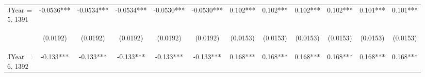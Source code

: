 \documentclass[]{article}
\begin{document}
\begin{center}
\begin{tabular}{lccccccccccc}
JYear = 5, 1391 & -0.0536*** & -0.0534*** & -0.0534*** & -0.0530*** & -0.0530*** & 0.102*** & 0.102*** & 0.102*** & 0.102*** & 0.101*** & 0.101*** \\
\vspace{4pt} & \begin{footnotesize}(0.0192)\end{footnotesize} & \begin{footnotesize}(0.0192)\end{footnotesize} & \begin{footnotesize}(0.0192)\end{footnotesize} & \begin{footnotesize}(0.0192)\end{footnotesize} & \begin{footnotesize}(0.0192)\end{footnotesize} & \begin{footnotesize}(0.0153)\end{footnotesize} & \begin{footnotesize}(0.0153)\end{footnotesize} & \begin{footnotesize}(0.0153)\end{footnotesize} & \begin{footnotesize}(0.0153)\end{footnotesize} & \begin{footnotesize}(0.0153)\end{footnotesize} & \begin{footnotesize}(0.0153)\end{footnotesize} \\
JYear = 6, 1392 & -0.133*** & -0.133*** & -0.133*** & -0.133*** & -0.133*** & 0.168*** & 0.168*** & 0.168*** & 0.168*** & 0.168*** & 0.168*** \\

\end{tabular}
\end{center}
\end{document}
